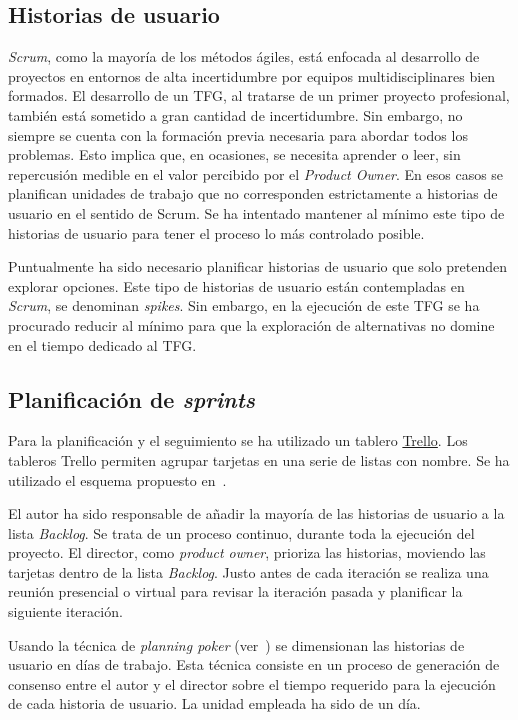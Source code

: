 \subsection{Historias de usuario}
\emph{Scrum}, como la mayoría de los métodos ágiles, está enfocada al desarrollo de proyectos en entornos de alta incertidumbre por equipos multidisciplinares bien formados. El desarrollo de un TFG, al tratarse de un primer proyecto profesional, también está sometido a gran cantidad de incertidumbre. Sin embargo, no siempre se cuenta con la formación previa necesaria para abordar todos los problemas. Esto implica que, en ocasiones, se necesita aprender o leer, sin repercusión medible en el valor percibido por el \emph{Product Owner}. En esos casos se planifican unidades de trabajo que no corresponden estrictamente a historias de usuario en el sentido de Scrum. Se ha intentado mantener al mínimo este tipo de historias de usuario para tener el proceso lo más controlado posible.

Puntualmente ha sido necesario planificar historias de usuario que solo pretenden explorar opciones.  Este tipo de historias de usuario están contempladas en \emph{Scrum}, se denominan \emph{spikes}. Sin embargo, en la ejecución de este TFG se ha procurado reducir al mínimo para que la exploración de alternativas no domine en el tiempo dedicado al TFG.

\subsection{Planificación de \emph{sprints}}
Para la planificación y el seguimiento se ha utilizado un tablero \href{http://trello.com}{Trello}. Los tableros Trello permiten agrupar tarjetas en una serie de listas con nombre. Se ha utilizado el esquema propuesto en~\cite{andrewlittlefield2016}.

El autor ha sido responsable de añadir la mayoría de las historias de usuario a la lista \emph{Backlog}.  Se trata de un proceso continuo, durante toda la ejecución del proyecto.  El director, como \emph{product owner}, prioriza las historias, moviendo las tarjetas dentro de la lista \emph{Backlog}. Justo antes de cada iteración se realiza una reunión presencial o virtual para revisar la iteración pasada y planificar la siguiente iteración.

Usando la técnica de \emph{planning poker} (ver~\cite{scrumguide}) se dimensionan las historias de usuario en días de trabajo. Esta técnica consiste en un proceso de generación de consenso entre el autor y el director sobre el tiempo requerido para la ejecución de cada historia de usuario. La unidad empleada ha sido de un día.

